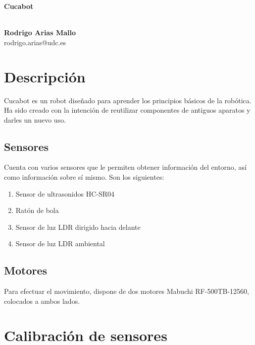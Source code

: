 \documentclass[10pt,a4paper,hidelinks]{article}
\begin{document}
\begin{center}
\begin{huge}
\textbf{Cucabot}
\end{huge}
\\[10pt]
\textbf{Rodrigo Arias Mallo}\\
rodrigo.arias@udc.es
\end{center}

\newcommand\RobotAngle{45}
\newcommand\RobotSize{2}
\newcommand\RobotRadius{4}
\newcommand\RobotThetaSonar{60.0}

\begin{multicols}{2}

\section{Descripción}
Cucabot es un robot diseñado para aprender los principios básicos de la robótica.
Ha sido creado con la intención de reutilizar componentes de antiguos aparatos y 
darles un nuevo uso.

\subsection{Sensores}
Cuenta con varios sensores que le permiten obtener información del entorno, así
como información sobre sí mismo. Son los siguientes:

\begin{enumerate}
	\setlength{\parskip}{0cm}

	\item Sensor de ultrasonidos HC-SR04
	\item Ratón de bola
	\item Sensor de luz LDR dirigido hacia delante
	\item Sensor de luz LDR ambiental
\end{enumerate}

\subsection{Motores}
Para efectuar el movimiento, dispone de dos motores Mabuchi RF-500TB-12560, colocados
a ambos lados.


\section{Calibración de sensores}

\end{multicols}
\end{document}
